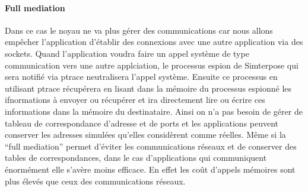 \paragraph{Full mediation} Dans ce cas le noyau ne va plus gérer des communications car nous allons empêcher l'application d'établir des connexions avec une autre application via des sockets. Quand l'application voudra faire un appel système de type communication vers une autre applciation, le processus espion de Simterpose qui sera notifié via ptrace neutralisera l'appel système. Ensuite ce processus en utilisant ptrace récupérera en lisant dans la mémoire du processus espionné les ifnormations à envoyer ou récupérer et ira directement lire ou écrire ces informations dans la mémoire du destinataire. Ainsi on n'a pas besoin de gérer de tableau de correspondance d'adresse et de ports et les applications peuvent conserver les adresses simulées qu'elles considèrent comme réelles.
Même si la ``full mediation'' permet d'éviter les communications réseaux et de conserver des tables de correspondances, dans le cas d'applications qui communiquent énormément elle s'avère moins efficace. En effet les coût d'appels mémoires sont plus élevés que ceux des communications réseaux.
